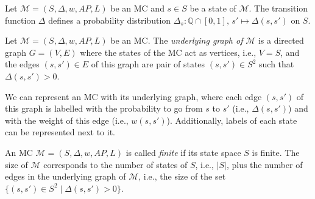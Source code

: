 \begin{property}
  Let $\mathcal{M} = (S, \Delta, w, AP, L)$ be an MC and $s \in S$ be a state of $\mathcal{M}$. The transition function $\Delta$ defines a probability distribution $\Delta_s: \mathbb{Q} \cap [0, 1], \, s' \mapsto \Delta(s, s')$ on $S$.
\end{property}

\begin{definition}
  Let $\mathcal{M}=(S, \Delta, w, AP, L)$ be an MC. The \textit{underlying graph of} $\mathcal{M}$ is a directed graph $G = (V, E)$ where the states of the MC act as vertices, i.e., $V = S$, and the edges $(s, s') \in E$ of this graph are pair of states $(s, s')\in S^2$ such that $\Delta(s, s')>0$.
\end{definition}

We can represent an MC with its underlying graph, where each edge $(s, s')$ of this graph is labelled with the probability to go from $s$ to $s'$ (i.e., $\Delta(s, s')$) and with the weight of this edge (i.e., $w(s, s')$).
Additionally, labels of each
state can be represented next to it.

\begin{notation}
  An MC $\mathcal{M}=(S, \Delta, w, AP, L)$ is called \textit{finite} if its state space $S$ is finite. The size of $\mathcal{M}$ corresponds to the number of states of $S$, i.e., $|S|$, plus
the number of edges in the underlying graph of $\mathcal{M}$, i.e., the size of the set
  $\{(s, s') \in S^2 \; | \; \Delta(s, s') > 0 \}$.
\end{notation}

